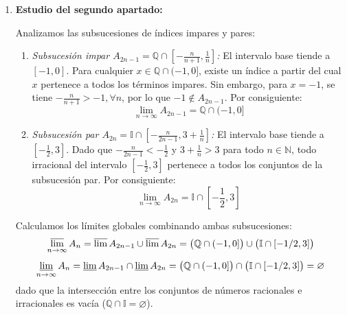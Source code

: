 \begin{problema}
\begin{enumerate}[label=\alph*)]
    Calculamos los límites de la sucesión global $\{A_n\}$ mediante la unión e intersección de los límites de sus subsucesiones:
    \[
        \varlimsup_{n \to \infty} A_n = \varlimsup A_{3n-2} \cup \varlimsup A_{3n-1} \cup \varlimsup A_{3n} = \left[\frac{1}{5}, 2\right) \cup \left[\frac{3}{5}, 3\right] \cup [1, \infty) = \left[\frac{1}{5}, \infty\right)
    \]
    \[
        \varliminf_{n \to \infty} A_n = \varliminf A_{3n-2} \cap \varliminf A_{3n-1} \cap \varliminf A_{3n} = \left[\frac{1}{5}, 2\right) \cap \left[\frac{3}{5}, 3\right] \cap [1, \infty) = [1, 2)
    \]

    \item \textbf{Estudio del segundo apartado:}
    
    Analizamos las subsucesiones de índices impares y pares:
    \begin{enumerate}[label=\arabic*.]
        \item \textit{Subsucesión impar $A_{2n-1} = \mathbb{Q} \cap \left[-\frac{n}{n+1}, \frac{1}{n}\right]$:}
        El intervalo base tiende a $[-1, 0]$. Para cualquier $x \in \mathbb{Q} \cap (-1, 0]$, existe un índice a partir del cual $x$ pertenece a todos los términos impares. Sin embargo, para $x = -1$, se tiene $-\frac{n}{n+1} > -1, \forall n$, por lo que $-1 \notin A_{2n-1}$. Por consiguiente:
        \[
            \lim_{n \to \infty} A_{2n-1} = \mathbb{Q} \cap (-1, 0]
        \]

        \item \textit{Subsucesión par $A_{2n} = \mathbb{I} \cap \left[-\frac{n}{2n-1}, 3 + \frac{1}{n}\right]$:}
        El intervalo base tiende a $\left[-\frac{1}{2}, 3\right]$. Dado que $-\frac{n}{2n-1} < -\frac{1}{2}$ y $3 + \frac{1}{n} > 3$ para todo $n \in \mathbb{N}$, todo irracional del intervalo $\left[-\frac{1}{2}, 3\right]$ pertenece a todos los conjuntos de la subsucesión par. Por consiguiente:
        \[
            \lim_{n \to \infty} A_{2n} = \mathbb{I} \cap \left[-\frac{1}{2}, 3\right]
        \]
    \end{enumerate}

    Calculamos los límites globales combinando ambas subsucesiones:
    \[
        \varlimsup_{n \to \infty} A_n = \varlimsup A_{2n-1} \cup \varlimsup A_{2n} = \bigl( \mathbb{Q} \cap (-1, 0] \bigr) \cup \bigl( \mathbb{I} \cap [-1/2, 3] \bigr)
    \]
    \[
        \varliminf_{n \to \infty} A_n = \varliminf A_{2n-1} \cap \varliminf A_{2n} = \bigl( \mathbb{Q} \cap (-1, 0] \bigr) \cap \bigl( \mathbb{I} \cap [-1/2, 3] \bigr) = \varnothing
    \]
    dado que la intersección entre los conjuntos de números racionales e irracionales es vacía ($\mathbb{Q} \cap \mathbb{I} = \varnothing$).
\end{enumerate}
\end{problema}
